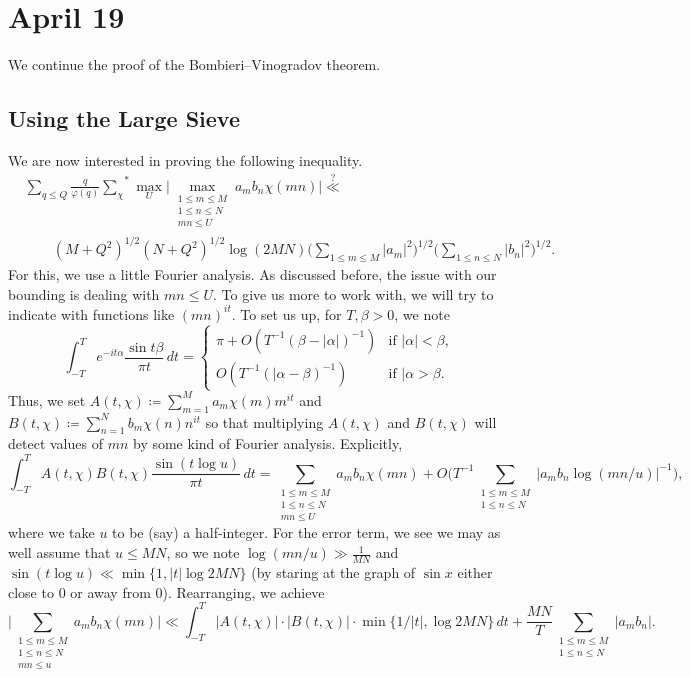 \documentclass[../notes.tex]{subfiles}
\begin{document}
\section{April 19}

We continue the proof of the Bombieri--Vinogradov theorem.

\subsection{Using the Large Sieve}
We are now interested in proving the following inequality.
\begin{align*}
	&\sum_{q\le Q}\frac q{\varphi(q)}{\sum_\chi}^*\max_U\bigg|\max_{\substack{1\le m\le M\\1\le n\le N\\mn\le U}}a_mb_n\chi(mn)\bigg| \stackrel?\ll \\
	&\qquad\left(M+Q^2\right)^{1/2}\left(N+Q^2\right)^{1/2}\log(2MN)\Bigg(\sum_{1\le m\le M}|a_m|^2\Bigg)^{1/2}\Bigg(\sum_{1\le n\le N}|b_n|^2\Bigg)^{1/2}.
\end{align*}
For this, we use a little Fourier analysis. As discussed before, the issue with our bounding is dealing with $mn\le U$. To give us more to work with, we will try to indicate with functions like $(mn)^{it}$. To set us up, for $T,\beta>0$, we note
\[\int_{-T}^Te^{-it\alpha}\frac{\sin t\beta}{\pi t}\,dt=\begin{cases}
	\pi+O\left(T^{-1}(\beta-|\alpha|)^{-1}\right) & \text{if }|\alpha|<\beta, \\
	O\left(T^{-1}(|\alpha-\beta)^{-1}\right) & \text{if }|\alpha>\beta.
\end{cases}\]
Thus, we set $A(t,\chi)\coloneqq\sum_{m=1}^Ma_m\chi(m)m^{it}$ and $B(t,\chi)\coloneqq\sum_{n=1}^Nb_m\chi(n)n^{it}$ so that multiplying $A(t,\chi)$ and $B(t,\chi)$ will detect values of $mn$ by some kind of Fourier analysis. Explicitly,
\[\int_{-T}^TA(t,\chi)B(t,\chi)\frac{\sin(t\log u)}{\pi t}\,dt=\sum_{\substack{1\le m\le M\\1\le n\le N\\mn\le U}}a_mb_n\chi(mn)+O\Bigg(T^{-1}\sum_{\substack{1\le m\le M\\1\le n\le N}}|a_mb_n\log(mn/u)|^{-1}\Bigg),\]
where we take $u$ to be (say) a half-integer. For the error term, we see we may as well assume that $u\le MN$, so we note $\log(mn/u)\gg\frac1{MN}$ and $\sin(t\log u)\ll\min\{1,|t|\log2MN\}$ (by staring at the graph of $\sin x$ either close to $0$ or away from $0$). Rearranging, we achieve
\[\Bigg|\sum_{\substack{1\le m\le M\\1\le n\le N\\mn\le u}}a_mb_n\chi(mn)\Bigg|\ll\int_{-T}^T|A(t,\chi)|\cdot|B(t,\chi)|\cdot\min\{1/|t|,\log2MN\}\,dt+\frac{MN}T\sum_{\substack{1\le m\le M\\1\le n\le N}}|a_mb_n|.\]
\end{document}
